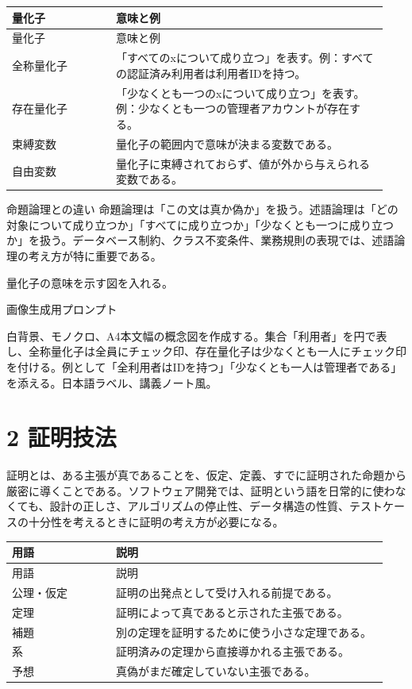 \documentclass[uplatex,dvipdfmx,a4paper,10pt]{jsarticle}
\begin{document}
\begin{longtable}{>{\raggedright\arraybackslash}p{0.26\linewidth} >{\raggedright\arraybackslash}p{0.68\linewidth}}
\toprule
量化子 & 意味と例 \\
\midrule
\endfirsthead
\toprule
量化子 & 意味と例 \\
\midrule
\endhead
全称量化子 & 「すべてのxについて成り立つ」を表す。例：すべての認証済み利用者は利用者IDを持つ。 \\
存在量化子 & 「少なくとも一つのxについて成り立つ」を表す。例：少なくとも一つの管理者アカウントが存在する。 \\
束縛変数 & 量化子の範囲内で意味が決まる変数である。 \\
自由変数 & 量化子に束縛されておらず、値が外から与えられる変数である。 \\
\bottomrule
\end{longtable}
\begin{infobox}{命題論理との違い}
命題論理は「この文は真か偽か」を扱う。述語論理は「どの対象について成り立つか」「すべてに成り立つか」「少なくとも一つに成り立つか」を扱う。データベース制約、クラス不変条件、業務規則の表現では、述語論理の考え方が特に重要である。
\end{infobox}
\begin{todobox}
量化子の意味を示す図を入れる。

画像生成用プロンプト

白背景、モノクロ、A4本文幅の概念図を作成する。集合「利用者」を円で表し、全称量化子は全員にチェック印、存在量化子は少なくとも一人にチェック印を付ける。例として「全利用者はIDを持つ」「少なくとも一人は管理者である」を添える。日本語ラベル、講義ノート風。
\end{todobox}
\section{2 証明技法}
証明とは、ある主張が真であることを、仮定、定義、すでに証明された命題から厳密に導くことである。ソフトウェア開発では、証明という語を日常的に使わなくても、設計の正しさ、アルゴリズムの停止性、データ構造の性質、テストケースの十分性を考えるときに証明の考え方が必要になる。

\begin{longtable}{>{\raggedright\arraybackslash}p{0.26\linewidth} >{\raggedright\arraybackslash}p{0.68\linewidth}}
\toprule
用語 & 説明 \\
\midrule
\endfirsthead
\toprule
用語 & 説明 \\
\midrule
\endhead
公理・仮定 & 証明の出発点として受け入れる前提である。 \\
定理 & 証明によって真であると示された主張である。 \\
補題 & 別の定理を証明するために使う小さな定理である。 \\
系 & 証明済みの定理から直接導かれる主張である。 \\
予想 & 真偽がまだ確定していない主張である。 \\
\bottomrule
\end{longtable}
\end{document}
